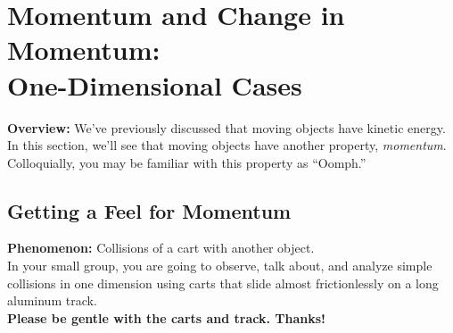 \section[Momentum and Change in Momentum: 1-D Cases]{Momentum and Change in Momentum:\\One-Dimensional Cases}
\label{act7.1.1}

\begin{overview}

\textbf{Overview:} We've previously discussed that moving objects have kinetic energy. In this section, we'll see that moving objects have another property, \emph{momentum}. Colloquially, you may be familiar with this property as ``Oomph.''
\end{overview}


\subsection{Getting a Feel for Momentum}
\label{act7.1.1c}

\textbf{Phenomenon:} Collisions of a cart with another object.\\

\noindent In your small group, you are going to observe, talk about, and analyze simple collisions in one dimension using carts that slide almost frictionlessly on a long aluminum track.\\

\noindent\textbf{Please be gentle with the carts and track. Thanks!}\\

